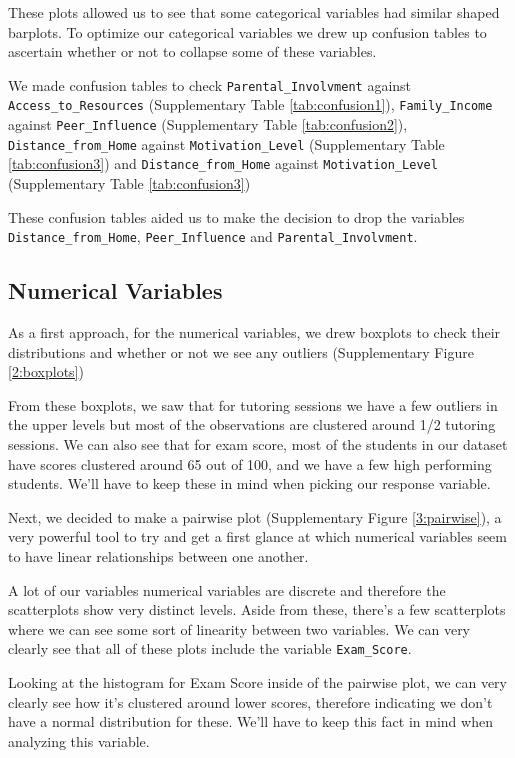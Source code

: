 \documentclass[twocolumn]{article} %
\begin{document}
These plots allowed us to see that some categorical variables had similar shaped barplots. To optimize our categorical variables we drew up confusion tables to ascertain whether or not to collapse some of these variables.

We made confusion tables to check \texttt{Parental\_Involvment} against \texttt{Access\_to\_Resources} (Supplementary Table \ref{tab:confusion1}), \texttt{Family\_Income} against \texttt{Peer\_Influence} (Supplementary Table \ref{tab:confusion2}), \texttt{Distance\_from\_Home} against \texttt{Motivation\_Level} (Supplementary Table \ref{tab:confusion3}) and \texttt{Distance\_from\_Home} against \texttt{Motivation\_Level} (Supplementary Table \ref{tab:confusion3})

These confusion tables aided us to make the decision to drop the variables \texttt{Distance\_from\_Home}, \texttt{Peer\_Influence} and \texttt{Parental\_Involvment}.

\subsection*{Numerical Variables}

As a first approach, for the numerical variables, we drew boxplots to check their distributions and whether or not we see any outliers (Supplementary Figure \ref{2:boxplots})

From these boxplots, we saw that for tutoring sessions we have a few outliers in the upper levels but most of the observations are clustered around 1/2 tutoring sessions. We can also see that for exam score, most of the students in our dataset have scores clustered around 65 out of 100, and we have a few high performing students. We'll have to keep these in mind when picking our response variable.

Next, we decided to make a pairwise plot (Supplementary Figure \ref{3:pairwise}), a very powerful tool to try and get a first glance at which numerical variables seem to have linear relationships between one another.

A lot of our variables numerical variables are discrete and therefore the scatterplots show very distinct levels. Aside from these, there's a few scatterplots where we can see some sort of linearity between two variables. We can very clearly see that all of these plots include the variable \texttt{Exam\_Score}.

Looking at the histogram for Exam Score inside of the pairwise plot, we can very clearly see how it's clustered around lower scores, therefore indicating we don't have a normal distribution for these. We'll have to keep this fact in mind when analyzing this variable.
\end{document}
